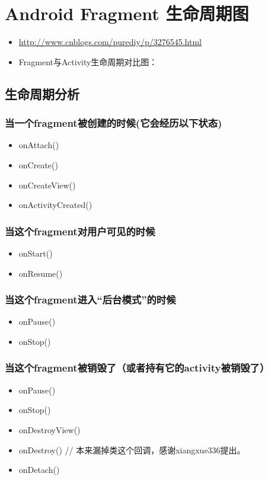 \documentclass[9pt, b5paper]{article}
\begin{document}
\section{Android Fragment 生命周期图}
\label{sec-2}
\begin{itemize}
\item \url{http://www.cnblogs.com/purediy/p/3276545.html}
\item Fragment与Activity生命周期对比图：
\end{itemize}

\subsection{生命周期分析}
\label{sec-2-1}
\subsubsection{当一个fragment被创建的时候(它会经历以下状态)}
\label{sec-2-1-1}
\begin{itemize}
\item onAttach()
\item onCreate()
\item onCreateView()
\item onActivityCreated()
\end{itemize}
\subsubsection{当这个fragment对用户可见的时候}
\label{sec-2-1-2}
\begin{itemize}
\item onStart()
\item onResume()
\end{itemize}
\subsubsection{当这个fragment进入“后台模式”的时候}
\label{sec-2-1-3}
\begin{itemize}
\item onPause()
\item onStop()
\end{itemize}
\subsubsection{当这个fragment被销毁了（或者持有它的activity被销毁了）}
\label{sec-2-1-4}
\begin{itemize}
\item onPause()
\item onStop()
\item onDestroyView()
\item onDestroy() // 本来漏掉类这个回调，感谢xiangxue336提出。
\item onDetach()
\end{itemize}
\end{document}
